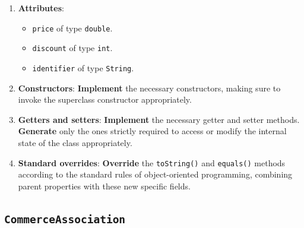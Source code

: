 \begin{enumerate}

    \item \textbf{Attributes}:

        \begin{itemize}

            \item \texttt{price} of type \texttt{double}.

            \item \texttt{discount} of type \texttt{int}.

            \item \texttt{identifier} of type \texttt{String}.

        \end{itemize}

    \item \textbf{Constructors}: \textbf{Implement} the necessary constructors, making sure to invoke the superclass constructor appropriately.

    \item \textbf{Getters and setters}: \textbf{Implement} the necessary getter and setter methods. \textbf{Generate} only the ones strictly required to access or modify the internal state of the class appropriately.

    \item \textbf{Standard overrides}: \textbf{Override} the \texttt{toString()} and \texttt{equals()} methods according to the standard rules of object-oriented programming, combining parent properties with these new specific fields.

\end{enumerate}

\subsection{\texttt{CommerceAssociation}}

